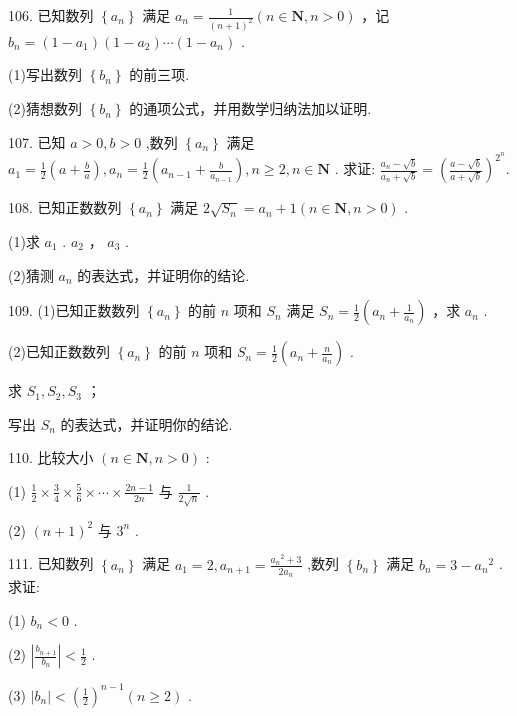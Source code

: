 \documentclass[10pt]{article}
\newcommand*\circled[1]{\tikz[baseline=(char.base)]{\node[shape=circle,draw,inner sep=1.5pt] (char) {\small #1};}}
\begin{document}
106. 已知数列 \(\left\{  {a}_{n}\right\}\) 满足 \({a}_{n} = \frac{1}{{\left( n + 1\right) }^{2}}\left( {n \in  \mathbf{N},n > 0}\right)\) ，记 \({b}_{n} = \left( {1 - {a}_{1}}\right) \left( {1 - {a}_{2}}\right) \cdots \left( {1 - {a}_{n}}\right)\) .

(1)写出数列 \(\left\{  {b}_{n}\right\}\) 的前三项.

(2)猜想数列 \(\left\{  {b}_{n}\right\}\) 的通项公式，并用数学归纳法加以证明.

107. 已知 \(a > 0,b > 0\) ,数列 \(\left\{  {a}_{n}\right\}\) 满足 \({a}_{1} = \frac{1}{2}\left( {a + \frac{b}{a}}\right) ,{a}_{n} = \frac{1}{2}\left( {{a}_{n - 1} + \frac{b}{{a}_{n - 1}}}\right) ,n \geq  2,n \in  \mathbf{N}\) . 求证: \(\frac{{a}_{n} - \sqrt{b}}{{a}_{n} + \sqrt{b}} = {\left( \frac{a - \sqrt{b}}{a + \sqrt{b}}\right) }^{{2}^{n}}.\)

108. 已知正数数列 \(\left\{  {a}_{n}\right\}\) 满足 \(2\sqrt{{S}_{n}} = {a}_{n} + 1\left( {n \in  \mathbf{N},n > 0}\right)\) .

(1)求 \({a}_{1}\) . \({a}_{2}\) ， \({a}_{3}\) .

(2)猜测 \({a}_{n}\) 的表达式，并证明你的结论.

109. (1)已知正数数列 \(\left\{  {a}_{n}\right\}\) 的前 \(n\) 项和 \({S}_{n}\) 满足 \({S}_{n} = \frac{1}{2}\left( {{a}_{n} + \frac{1}{{a}_{n}}}\right)\) ，求 \({a}_{n}\) .

(2)已知正数数列 \(\left\{  {a}_{n}\right\}\) 的前 \(n\) 项和 \({S}_{n} = \frac{1}{2}\left( {{a}_{n} + \frac{n}{{a}_{n}}}\right)\) .

 \circled{1}  求 \({S}_{1},{S}_{2},{S}_{3}\) ；

 \circled{2} 写出 \({S}_{n}\) 的表达式，并证明你的结论.

110. 比较大小 \(\left( {n \in  \mathbf{N},n > 0}\right)\) :

(1) \(\frac{1}{2} \times  \frac{3}{4} \times  \frac{5}{6} \times  \cdots  \times  \frac{{2n} - 1}{2n}\) 与 \(\frac{1}{2\sqrt{n}}\) .

(2) \({\left( n + 1\right) }^{2}\) 与 \({3}^{n}\) .

111. 已知数列 \(\left\{  {a}_{n}\right\}\) 满足 \({a}_{1} = 2,{a}_{n + 1} = \frac{{a}_{n}{}^{2} + 3}{2{a}_{n}}\) ,数列 \(\left\{  {b}_{n}\right\}\) 满足 \({b}_{n} = 3 - {a}_{n}{}^{2}\) . 求证:

(1) \({b}_{n} < 0\) .

(2) \(\left| \frac{{b}_{n + 1}}{{b}_{n}}\right|  < \frac{1}{2}\) .

(3) \(\left| {b}_{n}\right|  < {\left( \frac{1}{2}\right) }^{n - 1}\left( {n \geq  2}\right)\) .
\end{document}
